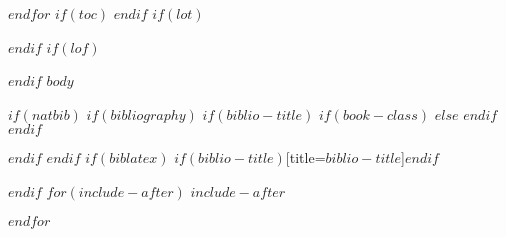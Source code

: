 \documentclass[a4paper, 16pt, oneside]{Thesis}
\begin{document}
$endfor$
$if(toc)$
{
\hypersetup{linkcolor=$if(toccolor)$$toccolor$$else$black$endif$}
\setcounter{tocdepth}{$toc-depth$}
\tableofcontents
}
$endif$
$if(lot)$
\listoftables
$endif$
$if(lof)$
\listoffigures
$endif$
$body$


$if(natbib)$
$if(bibliography)$
$if(biblio-title)$
$if(book-class)$
\renewcommand\bibname{$biblio-title$}
$else$
\renewcommand\refname{$biblio-title$}
$endif$
$endif$





$endif$
$endif$
$if(biblatex)$
\printbibliography$if(biblio-title)$[title=$biblio-title$]$endif$

$endif$
$for(include-after)$
$include-after$

$endfor$
\end{document}

